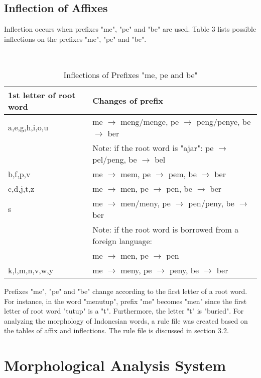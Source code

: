 \documentclass[english]{nlp}
\begin{document}
\subsection{Inflection of Affixes}
Inflection occurs when prefixes "me", "pe" and "be" are used. 
Table 3 lists possible inflections on the prefixes "me", "pe" and "be".
\begin{table}[ht]
\vspace{-4mm}
\begin{center}
\caption{Inflections of Prefixes "me, pe and be"}
~\\\vspace{-2mm}
\label{table:inflection}
\begin{tabular}{ll}
\hline
1st letter of root word & Changes of prefix\\
\hline
a,e,g,h,i,o,u & me ${\to}$ meng/menge, pe ${\to}$ peng/penye, be ${\to}$ ber \\
& Note: if the root word is "ajar": pe ${\to}$ pel/peng, be ${\to}$ bel \\
\hline
b,f,p,v & me ${\to}$ mem, pe ${\to}$ pem, be ${\to}$ ber \\
\hline
c,d,j,t,z & me ${\to}$ men, pe ${\to}$ pen, be ${\to}$ ber \\
\hline
s & me ${\to}$ men/meny, pe ${\to}$ pen/peny, be ${\to}$ ber \\
& Note: if the root word is borrowed from a foreign language:\\
& me ${\to}$ men, pe ${\to}$ pen \\
\hline
k,l,m,n,v,w,y & me ${\to}$ meny, pe ${\to}$ peny, be ${\to}$ ber \\
\hline
\end{tabular}
\end{center}
\end{table}
Prefixes "me", "pe" and "be" change according to the first letter of 
a root word. For instance, in the word "menutup", prefix "me" 
becomes "men" since the first letter of root word "tutup" is 
a "t".  Furthermore, the letter "t" is "buried".
For analyzing the morphology of Indonesian words, a rule file was 
created based on the tables of affix and inflections. The rule file is 
discussed in section 3.2.

\section{Morphological Analysis System}
\end{document}
